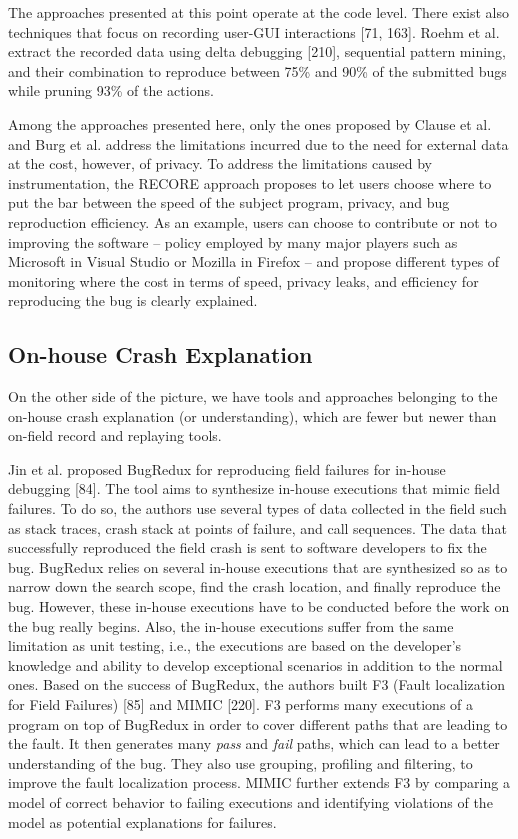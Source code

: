 \documentclass[12pt]{report}
\begin{document}
The approaches presented at this point operate at the code level. There
exist also techniques that focus on recording user-GUI interactions
{[}71, 163{]}. Roehm et al. extract the recorded data using delta
debugging {[}210{]}, sequential pattern mining, and their combination to
reproduce between 75\% and 90\% of the submitted bugs while pruning 93\%
of the actions.

Among the approaches presented here, only the ones proposed by Clause et
al. and Burg et al. address the limitations incurred due to the need for
external data at the cost, however, of privacy. To address the
limitations caused by instrumentation, the RECORE approach proposes to
let users choose where to put the bar between the speed of the subject
program, privacy, and bug reproduction efficiency. As an example, users
can choose to contribute or not to improving the software -- policy
employed by many major players such as Microsoft in Visual Studio or
Mozilla in Firefox -- and propose different types of monitoring where
the cost in terms of speed, privacy leaks, and efficiency for
reproducing the bug is clearly explained.

\subsection{On-house Crash
Explanation}\label{on-house-crash-explanation}

On the other side of the picture, we have tools and approaches belonging
to the on-house crash explanation (or understanding), which are fewer
but newer than on-field record and replaying tools.

Jin et al. proposed BugRedux for reproducing field failures for in-house
debugging {[}84{]}. The tool aims to synthesize in-house executions that
mimic field failures. To do so, the authors use several types of data
collected in the field such as stack traces, crash stack at points of
failure, and call sequences. The data that successfully reproduced the
field crash is sent to software developers to fix the bug. BugRedux
relies on several in-house executions that are synthesized so as to
narrow down the search scope, find the crash location, and finally
reproduce the bug. However, these in-house executions have to be
conducted before the work on the bug really begins. Also, the in-house
executions suffer from the same limitation as unit testing, i.e., the
executions are based on the developer's knowledge and ability to develop
exceptional scenarios in addition to the normal ones. Based on the
success of BugRedux, the authors built F3 (Fault localization for Field
Failures) {[}85{]} and MIMIC {[}220{]}. F3 performs many executions of a
program on top of BugRedux in order to cover different paths that are
leading to the fault. It then generates many \emph{pass} and \emph{fail}
paths, which can lead to a better understanding of the bug. They also
use grouping, profiling and filtering, to improve the fault localization
process. MIMIC further extends F3 by comparing a model of correct
behavior to failing executions and identifying violations of the model
as potential explanations for failures.
\end{document}
